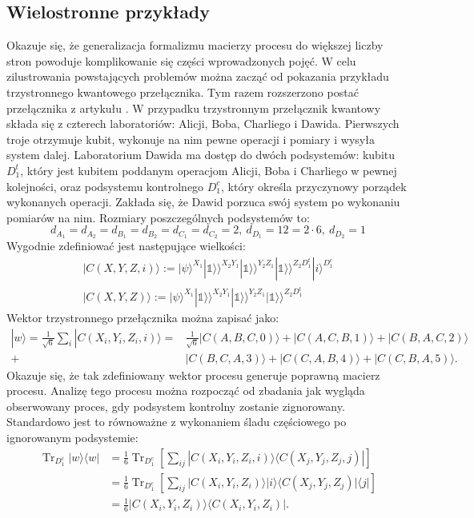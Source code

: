 \documentclass[10pt]{article} %
\DeclareMathOperator{\Trs}{Tr}
\newcommand{\Ket}[1]{|#1\rangle}
\newcommand{\Bra}[1]{\langle#1|}
\newcommand{\KKet}[1]{|#1\rangle\rangle}
\newcommand{\I}{\mathbb{1}}
\begin{document}
\subsection{Wielostronne przykłady}
Okazuje się, że generalizacja formalizmu macierzy procesu do większej liczby stron powoduje komplikowanie się części wprowadzonych pojęć. W celu zilustrowania powstających problemów można zacząć od pokazania przykładu trzystronnego kwantowego przełącznika. Tym razem rozszerzono postać przełącznika z artykułu \cite{causal_witness}. W przypadku trzystronnym przełącznik kwantowy składa się z czterech laboratoriów: Alicji, Boba, Charliego i Dawida. Pierwszych troje otrzymuje kubit, wykonuje na nim pewne operacji i pomiary i wysyła system dalej. Laboratorium Dawida ma dostęp do dwóch podsystemów: kubitu $D_1^t$, który jest kubitem poddanym operacjom Alicji, Boba i Charliego w pewnej kolejności, oraz podsystemu kontrolnego $D_1^c$, który określa przyczynowy porządek wykonanych operacji. Zakłada się, że Dawid porzuca swój system po wykonaniu pomiarów na nim. Rozmiary poszczególnych podsystemów to:
\begin{equation}
d_{A_1} = d_{A_2} = d_{B_1} = d_{B_2} = d_{C_1} = d_{C_2} = 2,~ d_{D_1} = 12 = 2 \cdot 6,~d_{D_2}=1
\end{equation}
Wygodnie zdefiniować jest następujące wielkości:
\begin{gather}
\Ket{C(X,Y,Z, i)} := \Ket{\psi}^{X_1}\KKet{\I}^{X_2Y_1}\KKet{\I}^{Y_2Z_1}\KKet{\I}^{Z_2D_1^t}\Ket{i}^{D_1^c} \\
\Ket{C(X,Y,Z)} := \Ket{\psi}^{X_1}\KKet{\I}^{X_2Y_1}\KKet{\I}^{Y_2Z_1}\KKet{\I}^{Z_2D_1^t}
\end{gather}
Wektor trzystronnego przełącznika można zapisać jako:
\begin{equation}
\begin{split}
\Ket{w} = \frac{1}{\sqrt{6}} \sum_i \Ket{C(X_i, Y_i, Z_i, i)} =& \frac{1}{\sqrt{6}} \Ket{C(A,B,C,0)} + \Ket{C(A,C,B,1)} + \Ket{C(B,A,C,2)} \\ +& \Ket{C(B,C,A,3)} + \Ket{C(C,A,B,4)} + \Ket{C(C,B,A,5)}.
\end{split}
\end{equation}
Okazuje się, że tak zdefiniowany wektor procesu generuje poprawną macierz procesu. Analizę tego procesu można rozpocząć od zbadania jak wygląda obserwowany proces, gdy podsystem kontrolny zostanie zignorowany. Standardowo jest to równoważne z wykonaniem śladu częściowego po ignorowanym podsystemie:
\begin{equation}
\begin{split}
\Trs_{D_1^c} \Ket{w}\Bra{w} &= \frac{1}{6}\Trs_{D_1^c} \left[ \sum_{ij} \Ket{C(X_i, Y_i, Z_i, i)}\Bra{C(X_j, Y_j, Z_j, j)}\right] \\
&=  \frac{1}{6}\Trs_{D_1^c} \left[ \sum_{ij} \Ket{C(X_i, Y_i, Z_i)}\Ket{i}\Bra{C(X_j, Y_j, Z_j)}\Bra{j}\right] \\ 
&= \frac{1}{6}\Ket{C(X_i, Y_i, Z_i)}\Bra{C(X_i, Y_i, Z_i)}.
\end{split}
\end{equation}
\end{document}
